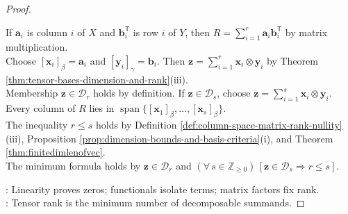 \begin{theorem}
\begin{proof}
\begin{enumerate}[label=(\roman*)]
If $\mathbf{a}_i$ is column $i$ of $X$ and $\mathbf{b}_i^{\mathsf{T}}$ is row $i$ of $Y$, then $R=\sum\limits_{i=1}^{r}\mathbf{a}_i\mathbf{b}_i^{\mathsf{T}}$ by matrix multiplication.\\
Choose $[\mathbf{x}_i]_\beta=\mathbf{a}_i$ and $[\mathbf{y}_i]_\gamma=\mathbf{b}_i$. Then $\mathbf{z}=\sum\limits_{i=1}^{r}\mathbf{x}_i\otimes\mathbf{y}_i$ by Theorem \ref{thm:tensor-bases-dimension-and-rank}(iii).\\
Membership $\mathbf{z}\in\mathcal{D}_r$ holds by definition. If $\mathbf{z}\in\mathcal{D}_s$, choose $\mathbf{z}=\sum\limits_{i=1}^{s}\mathbf{x}_i\otimes\mathbf{y}_i$. Every column of $R$ lies in $\operatorname{span}\{[\mathbf{x}_1]_\beta,\ldots,[\mathbf{x}_s]_\beta\}$.\\
The inequality $r\leq s$ holds by Definition \ref{def:column-space-matrix-rank-nullity}(iii), Proposition \ref{prop:dimension-bounds-and-basis-criteria}(i), and Theorem \ref{thm:finitedimlenofvec}.\\
The minimum formula holds by $\mathbf{z}\in\mathcal{D}_r$ and $(\forall\,s\in\mathbb{Z}_{\geq0})\,[\mathbf{z}\in\mathcal{D}_s\Rightarrow r\leq s]$.
\end{enumerate}
: Linearity proves zeros; functionals isolate terms; matrix factors fix rank.\\
: Tensor rank is the minimum number of decomposable summands.
\end{proof}
\end{theorem}


